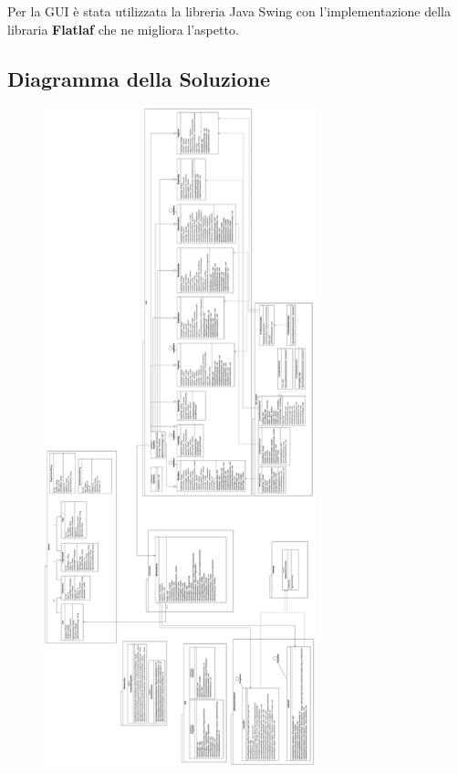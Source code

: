 \documentclass{article}
\begin{document}
	Per la GUI \`e stata utilizzata la libreria Java Swing con l'implementazione della libraria \textbf{Flatlaf} che ne migliora l'aspetto.

	\newpage

	\subsection{Diagramma della Soluzione}
	\begin{figure}[htbp]
		\centering
		\includegraphics[width=0.7\textwidth,height=0.7\textheight,keepaspectratio]{solution_diagram.png}
		\label{fig:10}
	\end{figure}
\end{document}

